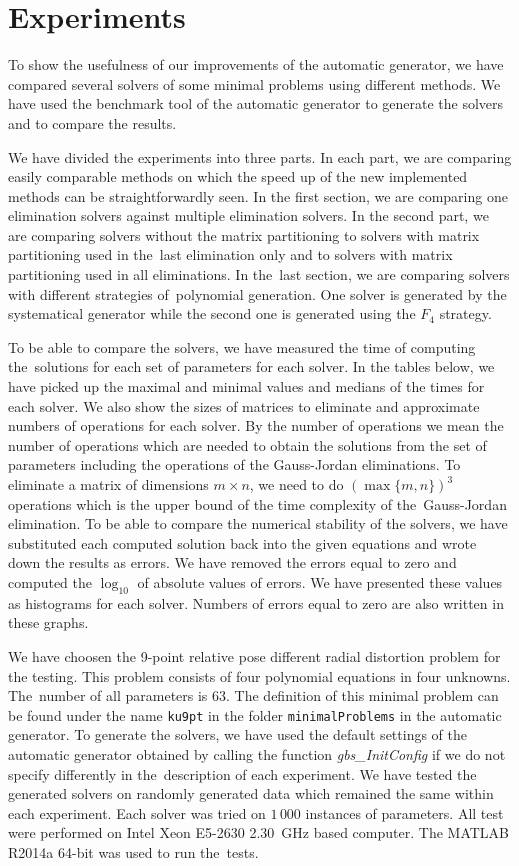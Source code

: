 \chapter{Experiments}
To show the usefulness of our improvements of the automatic generator, we have compared several solvers of some minimal problems using different methods. We have used the benchmark tool of the automatic generator to generate the solvers and to compare the results.

We have divided the experiments into three parts. In each part, we are comparing easily comparable methods on which the speed up of the new implemented methods can be straightforwardly seen. In the first section, we are comparing one elimination solvers against multiple elimination solvers. In the second part, we are comparing solvers without the matrix partitioning to solvers with matrix partitioning used in the~last elimination only and to solvers with matrix partitioning used in all eliminations. In the~last section, we are comparing solvers with different strategies of~polynomial generation. One solver is generated by the systematical generator while the second one is generated using the $F_4$ strategy.

To be able to compare the solvers, we have measured the time of computing the~solutions for each set of parameters for each solver. In the tables below, we have picked up the maximal and minimal values and medians of the times for each solver. We also show the sizes of matrices to eliminate and approximate numbers of operations for each solver. By the number of operations we mean the number of operations which are needed to obtain the solutions from the set of parameters including the operations of the Gauss-Jordan eliminations. To eliminate a matrix of dimensions $m \times n$, we need to do $(\max\{m, n\})^3$ operations which is the upper bound of the time complexity of the~Gauss-Jordan elimination. To be able to compare the numerical stability of the solvers, we have substituted each computed solution back into the given equations and wrote down the results as errors. We have removed the errors equal to zero and computed the $\log_{10}$ of absolute values of errors. We have presented these values as histograms for each solver. Numbers of errors equal to zero are also written in these graphs.

We have choosen the 9-point relative pose different radial distortion problem \cite{9pt} for the testing. This problem consists of four polynomial equations in four unknowns. The~number of all parameters is 63. The definition of this minimal problem can be found under the name \texttt{ku9pt} in the folder \texttt{minimalProblems} in the automatic generator. To generate the solvers, we have used the default settings of the automatic generator obtained by calling the function \textit{gbs\_InitConfig} if we do not specify differently in the~description of each experiment. We have tested the generated solvers on randomly generated data which remained the same within each experiment. Each solver was tried on $1\,000$ instances of parameters. All test were performed on Intel Xeon E5-2630 2.30~GHz based computer. The MATLAB R2014a 64-bit was used to run the~tests.

